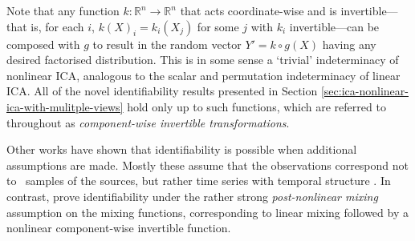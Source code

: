 %
%

Note that any function ${k}: \mathbb{R}^n \to \mathbb{R}^n$ that acts coordinate-wise and is invertible---that is, for each $i$, ${k}(X)_i = k_i(X_j)$ for some $j$ with $k_i$ invertible---can be composed with ${g}$ to result in the random vector $Y'={k}\circ {g}(X)$ having any desired factorised distribution. 
This is in some sense a `trivial' indeterminacy of nonlinear ICA, analogous to the scalar and permutation indeterminacy of linear ICA.
All of the novel identifiability results presented in Section \ref{sec:ica-nonlinear-ica-with-mulitple-views} hold only up to such functions, which are referred to throughout as \emph{component-wise invertible transformations}.


Other works have shown that identifiability is possible when additional assumptions are made.
Mostly these assume that the observations correspond not to \iid~samples of the sources, but rather time series with temporal structure \citep{cardoso2001three, singer2008non, sprekeler2014extension}.
In contrast, \cite{taleb1999source} prove identifiability under the rather strong \emph{post-nonlinear mixing} assumption on the mixing functions, corresponding to linear mixing followed by a nonlinear component-wise invertible function.



